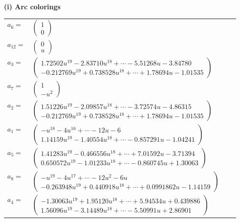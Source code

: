 \documentclass[1p]{elsarticle_modified}
\theoremstyle{definition}
\begin{document}
\flushleft \textbf{(i) Arc colorings}\\
\begin{tabular}{m{7pt} m{180pt} m{7pt} m{180pt} }
\flushright $a_{6}=$&$\begin{pmatrix}1\\0\end{pmatrix}$ \\
\flushright $a_{12}=$&$\begin{pmatrix}0\\u\end{pmatrix}$ \\
\flushright $a_{3}=$&$\begin{pmatrix}1.72502 u^{19}-2.83710 u^{18}+\cdots-5.51268 u-3.84780\\-0.212769 u^{19}+0.738528 u^{18}+\cdots+1.78694 u-1.01535\end{pmatrix}$ \\
\flushright $a_{7}=$&$\begin{pmatrix}1\\- u^2\end{pmatrix}$ \\
\flushright $a_{2}=$&$\begin{pmatrix}1.51226 u^{19}-2.09857 u^{18}+\cdots-3.72574 u-4.86315\\-0.212769 u^{19}+0.738528 u^{18}+\cdots+1.78694 u-1.01535\end{pmatrix}$ \\
\flushright $a_{1}=$&$\begin{pmatrix}- u^{18}-4 u^{16}+\cdots-12 u-6\\1.14159 u^{19}-1.40554 u^{18}+\cdots-0.857291 u-1.04241\end{pmatrix}$ \\
\flushright $a_{5}=$&$\begin{pmatrix}1.41283 u^{19}-0.466556 u^{18}+\cdots+7.01592 u-3.71394\\0.650572 u^{19}-1.01233 u^{18}+\cdots-0.860745 u+1.30063\end{pmatrix}$ \\
\flushright $a_{8}=$&$\begin{pmatrix}- u^{19}-4 u^{17}+\cdots-12 u^2-6 u\\-0.263948 u^{19}+0.440918 u^{18}+\cdots+0.0991862 u-1.14159\end{pmatrix}$ \\
\flushright $a_{4}=$&$\begin{pmatrix}-1.30063 u^{19}+1.95120 u^{18}+\cdots+5.94534 u+0.439886\\1.56096 u^{19}-3.14489 u^{18}+\cdots-5.50991 u+2.86901\end{pmatrix}$ \\

\end{tabular}
\end{document}
